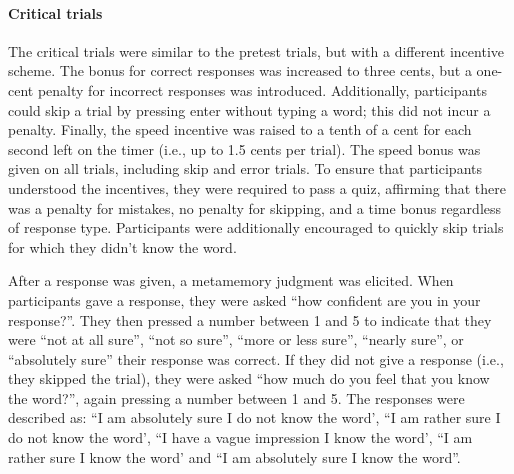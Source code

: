 \paragraph{Critical trials} The critical trials were similar to the pretest trials, but with a different incentive scheme. The bonus for correct responses was increased to three cents, but a one-cent penalty for incorrect responses was introduced. Additionally, participants could skip a trial by pressing enter without typing a word; this did not incur a penalty. Finally, the speed incentive was raised to a tenth of a cent for each second left on the timer (i.e., up to 1.5 cents per trial). The speed bonus was given on all trials, including skip and error trials. To ensure that participants understood the incentives, they were required to pass a quiz, affirming that there was a penalty for mistakes, no penalty for skipping, and a time bonus regardless of response type. Participants were additionally encouraged to quickly skip trials for which they didn't know the word.

After a response was given, a metamemory judgment was elicited. When participants gave a response, they were asked ``how confident are you in your response?''. They then pressed a number between 1 and 5 to indicate that they were ``not at all sure'', ``not so sure'', ``more or less sure'', ``nearly sure'', or ``absolutely sure'' their response was correct. If they did not give a response (i.e., they skipped the trial), they were asked ``how much do you feel that you know the word?'', again pressing a number between 1 and 5. The responses were described as: ``I am absolutely sure I do not know the word', ``I am rather sure I do not know the word', ``I have a vague impression I know the word', ``I am rather sure I know the word' and ``I am absolutely sure I know the word''. 

